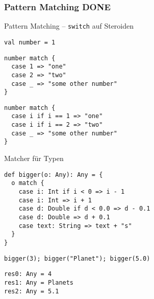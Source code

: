 \documentclass[14pt,aspectratio=169,trans]{beamer} %
\begin{document}
\subsubsection*{Pattern Matching DONE}





\begin{frame}[fragile]{}
	\begin{block}{Pattern Matching -- \texttt{switch} auf Steroiden}
\scriptsize
	\onslide<2->
  \begin{lstlisting}
val number = 1
	\end{lstlisting}
  \begin{lstlisting}[firstnumber=2]
number match {
  case 1 => "one"
  case 2 => "two"
  case _ => "some other number"
}
	\end{lstlisting}
  \begin{lstlisting}[firstnumber=7]
number match {
  case i if i == 1 => "one"
  case i if i == 2 => "two"
  case _ => "some other number"
}
	\end{lstlisting}
	\end{block}
\end{frame}

\begin{frame}[fragile]{}
	\begin{block}{Matcher für Typen}
\scriptsize
	\onslide<2->
  \begin{lstlisting}
def bigger(o: Any): Any = {
  o match {
    case i: Int if i < 0 => i - 1
    case i: Int => i + 1
    case d: Double if d < 0.0 => d - 0.1
    case d: Double => d + 0.1
    case text: String => text + "s"
  }
}
	\end{lstlisting}
  \begin{lstlisting}[firstnumber=10]
bigger(3); bigger("Planet"); bigger(5.0)
	\end{lstlisting}
  \begin{lstlisting}[firstnumber=11]
res0: Any = 4
res1: Any = Planets
res2: Any = 5.1
	\end{lstlisting}
	\end{block}
	\note{}
\end{frame}
\end{document}
